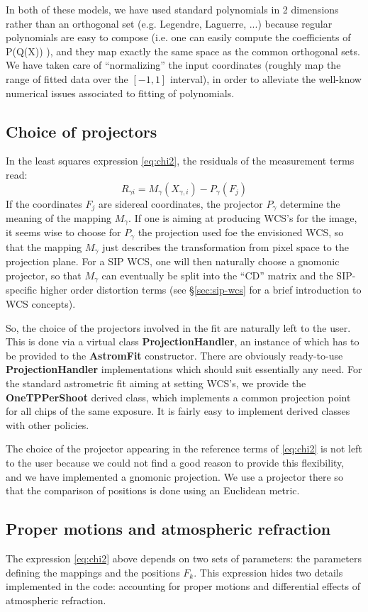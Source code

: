 \documentclass[a4paper,12pt]{scrartcl}
\newcommand{\ClName}[1]{{\bf #1}}
\def\bf{\normalfont\bfseries}
\begin{document}
In both of these models, we have used standard polynomials in 2
dimensions rather than an orthogonal set (e.g. Legendre, Laguerre,
...)  because regular polynomials are easy to compose (i.e. one can
easily compute the coefficients of P(Q(X)) ), and they map exactly the
same space as the common orthogonal sets. We have taken care of
``normalizing'' the input coordinates (roughly map the range of fitted
data over the $[-1,1]$ interval), in order to alleviate the well-know
numerical issues associated to fitting of polynomials.

\subsection{Choice of projectors}
In the least squares expression \ref{eq:chi2}, the residuals of the
measurement terms read:
$$
R_{\gamma i} = M_\gamma(X_{\gamma,i})-P_{\gamma}(F_j)
$$
If the coordinates $F_j$ are sidereal coordinates,
the projector $P_\gamma$ determine the meaning of
the mapping $M_\gamma$. If one is aiming at producing
WCS's for the image, it seems wise to choose for
$P_\gamma$ the projection used foe the envisioned WCS,
so that the mapping $M_\gamma$ just describes the 
transformation from pixel space to the projection plane.
For a SIP WCS, one will then naturally choose a gnomonic projector,
so that $M_\gamma$ can eventually be split into the ``CD'' matrix 
and the SIP-specific higher order distortion terms (see \S \ref{sec:sip-wcs}
for a brief introduction to WCS concepts).

So, the choice of the projectors involved in the fit
are naturally left to the user. This is done via a
virtual class \ClName{ProjectionHandler}, an instance
of which has to be provided to the \ClName{AstromFit} constructor.
There are obviously ready-to-use \ClName{ProjectionHandler} implementations
which should suit essentially any need. For the standard astrometric
fit aiming at setting WCS's, we provide the \ClName{OneTPPerShoot}
derived class, which implements a common projection point
for all chips of the same exposure. It is fairly easy to implement
derived classes with other policies.

The choice of the projector appearing in the reference terms of
\ref{eq:chi2} is not left to the user because we could not find a good
reason to provide this flexibility, and we have implemented a gnomonic
projection. We use a projector there so that the comparison of
positions is done using an Euclidean metric.


\subsection{Proper motions and atmospheric refraction}
The expression \ref{eq:chi2} above depends on two sets of parameters:
the parameters defining the mappings and the positions $F_k$. This expression
hides two details implemented in the code: accounting for proper
motions and differential effects of atmospheric refraction.
\end{document}
